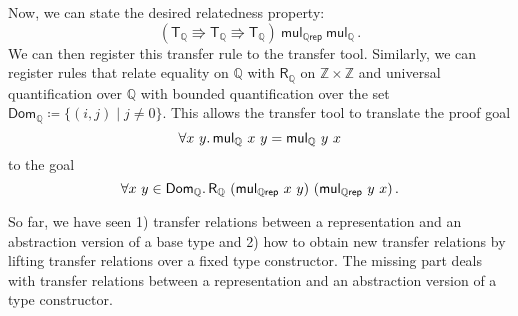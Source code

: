 \documentclass{article}
\theoremstyle{definition}
\newcommand{\inte}{\mathbb{Z}}
\newcommand{\rat}{\mathbb{Q}}
\begin{document}
Now, we can state the desired relatedness property:
\begin{equation*}
	(\mathsf{T_\rat} \Rrightarrow \mathsf{T_\rat} \Rrightarrow \mathsf{T_\rat})\ \mathsf{mul_{\rat rep}}\ \mathsf{mul_\rat}\,.
\end{equation*}
We can then register this transfer rule to the transfer tool.
Similarly, we can register rules that relate equality on \(\rat\) with \(\mathsf{R_\rat}\) on \(\inte \times \inte\) and universal quantification over \(\rat\) with bounded quantification over the set \(\mathsf{Dom_\rat} \coloneqq \{(i, j) \mid j \neq 0\}\).
This allows the transfer tool to translate the proof goal
\begin{equation*}
	\forall x\ y\ldotp \mathsf{mul_\rat}\ x\ y = \mathsf{mul_\rat}\ y\ x
\end{equation*}
to the goal
\begin{equation*}
	\forall x\ y \in \mathsf{Dom_\rat}\ldotp \mathsf{R_\rat}\ (\mathsf{mul_{\rat rep}}\ x\ y)\ (\mathsf{mul_{\rat rep}}\ y\ x)\,.
\end{equation*}

So far, we have seen
1) transfer relations between a representation and an abstraction version of a base type and
2) how to obtain new transfer relations by lifting transfer relations over a fixed type constructor.
The missing part deals with transfer relations between a representation and an abstraction version of a type constructor.
\end{document}
